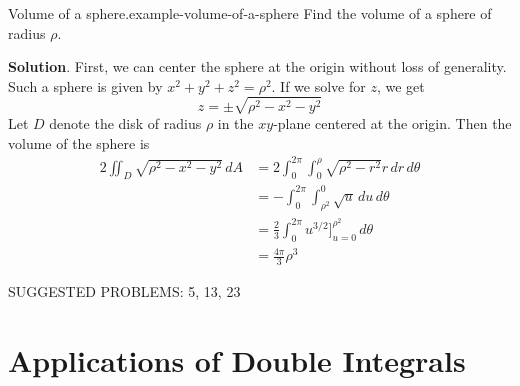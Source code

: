 \documentclass[10pt,]{book}
\numberwithin{equation}{section}
\begin{document}
\begin{example}{Volume of a sphere.}{example-volume-of-a-sphere}%
\hypertarget{p-1493}{}%
Find the volume of a sphere of radius \(\rho\).%
\par\smallskip%
\noindent\textbf{Solution}.\hypertarget{solution-245}{}\quad%
\hypertarget{p-1494}{}%
First, we can center the sphere at the origin without loss of generality. Such a sphere is given by \(x^{2} + y^{2} + z^{2} = \rho^{2}\). If we solve for \(z\), we get%
\begin{equation*}
z = \pm\sqrt{\rho^{2} - x^{2} - y^{2}}
\end{equation*}
Let \(D\) denote the disk of radius \(\rho\) in the \(xy\)-plane centered at the origin. Then the volume of the sphere is%
\begin{align*}
2\iint_{D}\sqrt{\rho^{2} - x^{2} - y^{2}}\,dA & = 2\int_{0}^{2\pi}\int_{0}^{\rho}\sqrt{\rho^{2} - r^{2}}r\,dr\,d\theta \\
& = -\int_{0}^{2\pi}\int_{\rho^{2}}^{0}\sqrt{u}\,du\,d\theta \\
& = \frac{2}{3}\int_{0}^{2\pi}u^{3/2}\bigg]_{u=0}^{\rho^{2}}\,d\theta \\
& = \frac{4\pi}{3}\rho^{3} 
\end{align*}
%
\end{example}
\hypertarget{p-1495}{}%
SUGGESTED PROBLEMS: 5, 13, 23%
%
%
\typeout{************************************************}
\typeout{************************************************}
%
\section[{Applications of Double Integrals}]{Applications of Double Integrals}\label{section-applications-of-double-integrals}
%
%
\typeout{************************************************}
\typeout{************************************************}
%
\end{document}
